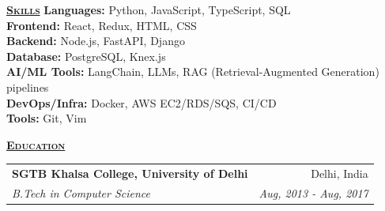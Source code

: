 \documentclass[11pt, a4paper]{article}
\begin{document}
\begin{flushleft}
    \uline{\textsc{\large{\textbf{Skills}}}\hfill}
    \newline
    \newline
    \textbf{Languages:} Python, JavaScript, TypeScript, SQL \\
    \textbf{Frontend:} React, Redux, HTML, CSS \\
    \textbf{Backend:} Node.js, FastAPI, Django \\
    \textbf{Database:} PostgreSQL, Knex.js \\
    \textbf{AI/ML Tools:} LangChain, LLMs, RAG (Retrieval-Augmented Generation) pipelines \\
    \textbf{DevOps/Infra:} Docker, AWS EC2/RDS/SQS, CI/CD \\
    \textbf{Tools:} Git, Vim \\
\end{flushleft}

\begin{flushleft}
    \uline{\textsc{\large{\textbf{Education}}}\hfill}
    \newline
    \newline
    \setlength\tabcolsep{0pt}
    \begin{tabularx}{\textwidth}{X r}
        \large{\textbf{SGTB Khalsa College, University of Delhi}} & Delhi, India \\
        \textit{B.Tech in Computer Science} & \textit{Aug, 2013 - Aug, 2017} \\
    \end{tabularx}
    \newline
\end{flushleft}
\end{document}
